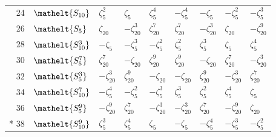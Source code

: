 \documentclass[10pt,a4paper]{article}
\numberwithin{equation}{section}
\newcommand{\eltfont}[1]{{\let\sigma\eltsigma\mathelt{#1}}}
\newcommand{\cls}[1]{\eltfont{#1}}
\newcommand{\rootunity}[1]{\zeta_{#1}}
\begin{document}
{\begin{longtable}{@{}rllllllll@{}}
24 & $\cls{S_{10}}$ & $\rootunity{5}^{2}$ & $\rootunity{5}$ & $\rootunity{5}^{4}$ & $-\rootunity{5}^{4}$ & $-\rootunity{5}$ & $-\rootunity{5}^{2}$ & $-\rootunity{5}^{3}$\\
26 & $\cls{S_{5}}$ & $\rootunity{20}$ & $-\rootunity{20}^{3}$ & $\rootunity{20}^{7}$ & $\rootunity{20}^{7}$ & $-\rootunity{20}^{3}$ & $\rootunity{20}$ & $-\rootunity{20}^{9}$\\
28 & $\cls{S_{10}^{3}}$ & $-\rootunity{5}$ & $-\rootunity{5}^{3}$ & $-\rootunity{5}^{2}$ & $\rootunity{5}^{2}$ & $\rootunity{5}^{3}$ & $\rootunity{5}$ & $\rootunity{5}^{4}$\\
30 & $\cls{S_{5}^{7}}$ & $\rootunity{20}^{7}$ & $-\rootunity{20}$ & $\rootunity{20}^{9}$ & $\rootunity{20}^{9}$ & $-\rootunity{20}$ & $\rootunity{20}^{7}$ & $-\rootunity{20}^{3}$\\
32 & $\cls{S_{5}^{3}}$ & $-\rootunity{20}^{3}$ & $\rootunity{20}^{9}$ & $-\rootunity{20}$ & $-\rootunity{20}$ & $\rootunity{20}^{9}$ & $-\rootunity{20}^{3}$ & $\rootunity{20}^{7}$\\
34 & $\cls{S_{10}^{7}}$ & $-\rootunity{5}^{4}$ & $-\rootunity{5}^{2}$ & $-\rootunity{5}^{3}$ & $\rootunity{5}^{3}$ & $\rootunity{5}^{2}$ & $\rootunity{5}^{4}$ & $\rootunity{5}$\\
36 & $\cls{S_{5}^{9}}$ & $-\rootunity{20}^{9}$ & $\rootunity{20}^{7}$ & $-\rootunity{20}^{3}$ & $-\rootunity{20}^{3}$ & $\rootunity{20}^{7}$ & $-\rootunity{20}^{9}$ & $\rootunity{20}$\\*
38 & $\cls{S_{10}^{9}}$ & $\rootunity{5}^{3}$ & $\rootunity{5}^{4}$ & $\rootunity{5}$ & $-\rootunity{5}$ & $-\rootunity{5}^{4}$ & $-\rootunity{5}^{3}$ & $-\rootunity{5}^{2}$\\
\bottomrule\end{longtable}}
\end{document}
